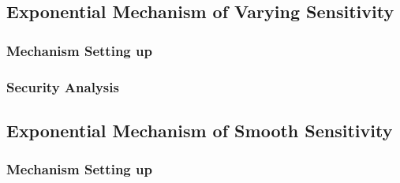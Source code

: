 

\subsection{Exponential Mechanism of Varying Sensitivity}
\label{subsec_emvs}
\subsubsection{Mechanism Setting up}

\subsubsection{Security Analysis}

\subsection{Exponential Mechanism of Smooth Sensitivity}
\label{subsec_emss}
\subsubsection{Mechanism Setting up}

